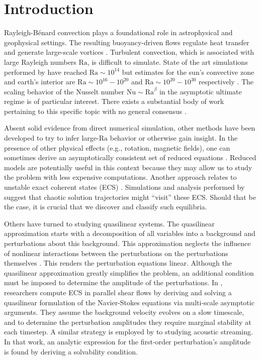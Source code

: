 \documentclass[reprint,amsmath,amssymb,aps]{revtex4-1}
\newcommand\Ra{\mathrm{Ra}}
\newcommand\Nu{\mathrm{Nu}}
\begin{document}
\section{Introduction}
Rayleigh-B\'enard convection plays a foundational role in astrophysical and geophysical settings.
The resulting buoyancy-driven flows regulate heat transfer and generate large-scale vortices \cite{Couston}.
Turbulent convection, which is associated with large Rayleigh numbers $\Ra$, is difficult to simulate. 
State of the art simulations performed by \cite{Zhu_2018} have reached $\Ra \sim 10^{14}$ but estimates for the sun's convective zone and earth's interior are $\Ra \sim 10^{16}-10^{20}$ and $\Ra \sim 10^{20}-10^{30}$ respectively \cite{Ossendrijver,Gubbins_2001}. 
The scaling behavior of the Nusselt number $\Nu \sim \Ra^{\beta}$ in the asymptotic ultimate regime is of particular interest.
There exists a substantial body of work pertaining to this specific topic with no general consensus \cite{Malkus_1954, Howard_1966, Kraichnan, Spiegel, Castaing, Grossman, Ahlers}. 

Absent solid evidence from direct numerical simulation, other methods have been developed to try to infer large-$\Ra$ behavior or otherwise gain insight.
In the presence of other physical effects (e.g., rotation, magnetic fields), one can sometimes derive an asymptotically consistent set of reduced equations \cite{Julien2007, Julien2012}.
Reduced models are potentially useful in this context because they may allow us to study the problem with less expensive computations.
Another approach relates to unstable exact coherent states (ECS) \cite{Waleffe, Sondak, Wen, chini_cells}. 
Simulations and analysis performed by \cite{Yalniz, Cvitanovic} suggest that chaotic solution trajectories might ``visit'' these ECS.
Should that be the case, it is crucial that we discover and classify such equilibria. 

Others have turned to studying quasilinear systems.
The quasilinear approximation starts with a decomposition of all variables into a background and perturbations about this background.
This approximation neglects the influence of nonlinear interactions between the perturbations on the perturbations themselves \cite{marston2016}.
This renders the perturbation equations linear.
Although the quasilinear approximation greatly simplifies the problem, an additional condition must be imposed to determine the amplitude of the perturbations.
In \cite{Beaume_2015}, researchers compute ECS in parallel shear flows by deriving and solving a quasilinear formulation of the Navier-Stokes equations via multi-scale asymptotic arguments. 
They assume the background velocity evolves on a slow timescale, and to determine the perturbation amplitudes they require marginal stability at each timestep.
A similar strategy is employed by \cite{michel_chini_2019} to studying acoustic streaming.
In that work, an analytic expression for the first-order perturbation's amplitude is found by deriving a solvability condition.
\end{document}
